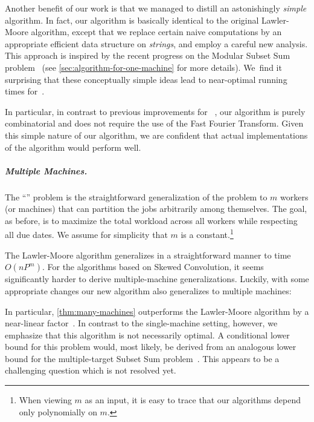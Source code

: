 \documentclass[10pt,a4paper]{article}
\makeatletter
\newcommand\IfRestateTF{%
  \ifx\label\thmt@gobble@label %
    \expandafter\@firstoftwo
  \else
    \expandafter\@secondoftwo
  \fi
}
\newcommand{\RestateRemark}{\IfRestateTF{{\normalfont\bfseries (Restated) }}{}}
\newcommand\Order{O}
\newcommand\order{o}
\newcommand\MTPT{\smash{$1||\sum p_j U_j$}}
\newcommand\mMTPT{\smash{$P_m||\sum p_j U_j$}}
\makeatother
\begin{document}
Another benefit of our work is that we managed to distill an astonishingly \emph{simple} algorithm. In fact, our algorithm is basically identical to the original Lawler-Moore algorithm, except that we replace certain naive computations by an appropriate efficient data structure on \emph{strings}, and employ a careful new analysis. This approach is inspired by the recent progress on the Modular Subset Sum problem~\cite{AxiotisBJTW19,AxiotisBBJNTW21,CardinalI21,Potepa21} (see \cref{sec:algorithm-for-one-machine} for more details). We~find it surprising that these conceptually simple ideas lead to near-optimal running times for~. 

In particular, in contrast to previous improvements for \MTPT{}~\cite{BringmannFHSW22,KleinPR23,SchieberS23}, our algorithm is purely combinatorial and does not require the use of the Fast Fourier Transform. Given this simple nature of our algorithm, we are confident that actual implementations of the algorithm would perform well.

\subparagraph{Multiple Machines.}
The ``\mMTPT{}'' problem is the straightforward generalization of the \MTPT{} problem to $m$ workers (or machines) that can partition the jobs arbitrarily among themselves. The goal, as before, is to maximize the total workload across all workers while respecting all due dates. We assume for simplicity that $m$ is a constant.\footnote{When viewing $m$ as an input, it is easy to trace that our algorithms depend only polynomially on $m$.}

The Lawler-Moore algorithm generalizes in a straightforward manner to time $\Order(n P^m)$. For the algorithms based on Skewed Convolution, it seems significantly harder to derive multiple-machine generalizations.
Luckily, with some appropriate changes our new algorithm also generalizes to multiple machines:


In particular, \cref{thm:many-machines} outperforms the Lawler-Moore algorithm by a near-linear factor~. In contrast to the single-machine setting, however, we emphasize that this algorithm is not necessarily optimal. A conditional lower bound for this problem would, most likely, be derived from an analogous lower bound for the multiple-target Subset Sum problem~\cite{AntonopoulosPPV23}. This appears to be a challenging question which is not resolved yet.
\end{document}
